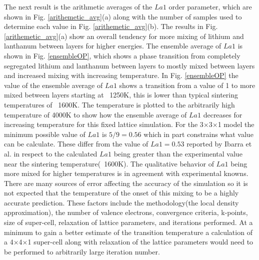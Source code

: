 \documentclass[aps,pre,reprint,superscriptaddress,showkeys]{revtex4-2}
\begin{document}
The next result is the arithmetic averages of the $La1$  order parameter, which are  shown in Fig. \ref{arithemetic_avg}(a) along with the number of samples used to determine each value in Fig. \ref{arithemetic_avg}(b). The results in Fig. \ref{arithemetic_avg}(a) show an overall tendency for more mixing of lithium and lanthanum between layers for higher energies. The ensemble average of $La1$ is shown in Fig. \ref{ensembleOP}, which shows a phase transition from completely segregated lithium and lanthanum between layers to mostly mixed between layers and increased mixing with increasing temperature. In Fig. \ref{ensembleOP} the value of the ensemble average of $La1$ shows a transition from a value of 1 to more mixed between layers starting at ~1250K, this is lower than typical sintering temperatures of ~1600K. The temperature is plotted to the arbitrarily high temperature of 4000K to show how the ensemble average of $La1$ decreases for increasing temperature for this fixed lattice simulation. For the 3$\times$3$\times$1 model the minimum possible value of $La1$ is $5/9 = 0.56$ which in part constrains what value can be calculate. These differ from the value of $La1=0.53$ reported by Ibarra et al. \cite{P4mmmstrucuture}  in respect to the calculated $La1$ being greater than the  experimental value near the sintering temperature(~1600K). The qualitative behavior of $La1$ being more mixed for higher temperatures is in agreement with experimental knowns. There are many sources of error affecting the accuracy of the simulation so it is not expected that the temperature of the onset of this mixing to be a highly accurate prediction.  These factors include the methodology(the local density approximation), the number of valence electrons, convergence criteria, k-points, size of super-cell, relaxation of lattice parameters,  and iterations performed.  At a minimum to gain a better estimate of the transition temperature a calculation of a 4$\times$4$\times$1 super-cell along with relaxation of the lattice parameters would need to be performed to arbitrarily large iteration number. 
\end{document}
